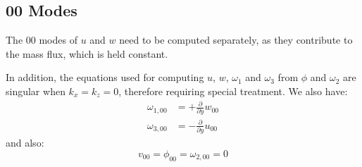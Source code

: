 \documentclass[titlepage,12pt,letter]{article}
\newcommand{\p}{\partial}
\numberwithin{equation}{section}
\begin{document}
\subsection{00 Modes}
The 00 modes of $u$ and $w$ need to be computed separately, as they contribute to the mass flux, which is held constant. 

In addition, the equations used for computing $u$, $w$, $\omega_1$ and $\omega_3$ from $\phi$ and $\omega_2$ are singular when $k_x = k_z = 0$, therefore requiring special treatment. We also have:
\begin{align*}
	\omega_{1,00} &= +\frac{\p}{\p y} w_{00}\\
	\omega_{3,00} &= -\frac{\p}{\p y} u_{00}
\end{align*}
and also:
\begin{equation}
	v_{00} = \phi_{00} = \omega_{2,00} = 0 \label{eq:00}
\end{equation}
\end{document}
